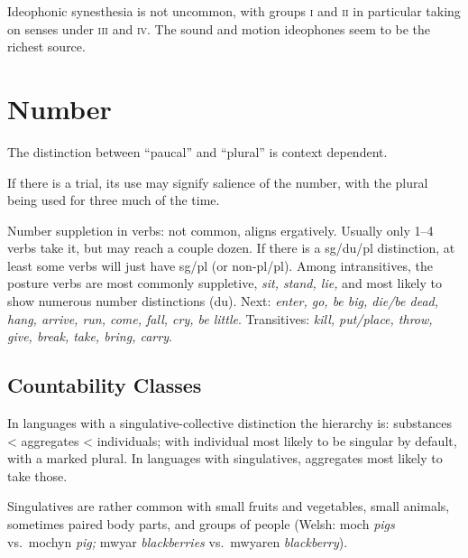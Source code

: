 \documentclass[11pt]{article}
\newcommand{\I}[1]{\textsc{#1}}   %
\begin{document}
Ideophonic synesthesia is not uncommon, with groups \I{i} and \I{ii}
in particular taking on senses under \I{iii} and \I{iv}.  The sound
and motion ideophones seem to be the richest source.


\section{Number}
The distinction between ``paucal'' and ``plural'' is context
dependent. 

If there is a trial, its use may signify salience of the number, with
the plural being used for three much of the time.

Number suppletion in verbs: not common, aligns ergatively.  Usually
only 1--4 verbs take it, but may reach a couple dozen.  If there is a
sg/du/pl distinction, at least some verbs will just have sg/pl (or
non-pl/pl).  Among intransitives, the posture verbs are most commonly
suppletive, \textit{sit, stand, lie,} and most likely to show numerous
number distinctions (du).  Next: \textit{enter, go, be big, die/be
  dead, hang, arrive, run, come, fall, cry, be little}.  Transitives:
\textit{kill, put/place, throw, give, break, take, bring, carry}.


\subsection{Countability Classes}  In languages with a
singulative-collective distinction the hierarchy is: substances <
aggregates < individuals; with individual most likely to be singular
by default, with a marked plural.  In languages with singulatives,
aggregates most likely to take those.

Singulatives are rather common with small fruits and vegetables, small
animals, sometimes paired body parts, and groups of people (Welsh:
moch \textit{pigs} vs.\ mochyn \textit{pig;} mwyar
\textit{blackberries} vs.\ mwyaren \textit{blackberry}).


\end{document}

